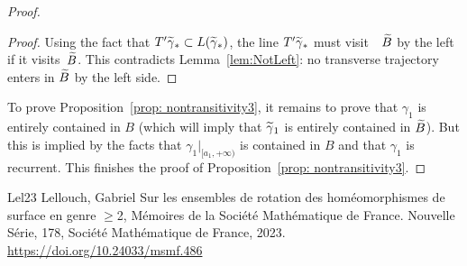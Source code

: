 \documentclass[10pt,a4paper]{article}
\theoremstyle{definition}
\theoremstyle{plain}
\numberwithin{equation}{section}
\numberwithin{figure}{section}
\let\oldtilde\tilde
\renewcommand*{\tilde}[1]{\mathchoice{\widetilde{#1}}{\widetilde{#1}}{\oldtilde{#1}}{\oldtilde{#1}}}
\begin{document}
\begin{proof}
\begin{proof}
Using the fact that $T'\tilde\gamma_*\subset L(\tilde\gamma_*)$, the line $T'\tilde\gamma_*$ must visit~~$\tilde B$ by the left if it visits~$\tilde B$. This contradicts Lemma~\ref{lem:NotLeft}: no transverse trajectory enters in $\tilde B$ by the left side.
\end{proof}

To prove Proposition~\ref{prop: nontransitivity3}, it remains to prove that $\gamma_1$ is entirely contained in $B$ (which will imply that $\tilde\gamma_1$ is entirely contained in $\tilde B$). But this is implied by the facts that $\gamma_1\vert_{[a_1,+\infty)}$ is contained in $B$ and that $\gamma_1$ is recurrent. This finishes the proof of Proposition~\ref{prop: nontransitivity3}.
\end{proof}

\begin{thebibliography}{Lel23}
 Lellouch, Gabriel Sur les ensembles de rotation des homéomorphismes de surface en genre $\geq$2, Mémoires de la Société Mathématique de France. Nouvelle Série, 178, Société Mathématique de France, 2023. \url{https://doi.org/10.24033/msmf.486}
\end{thebibliography}
\end{document}
